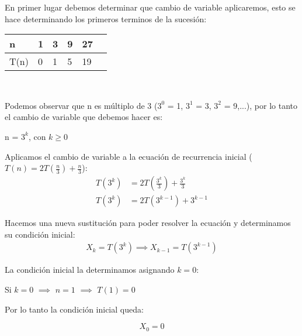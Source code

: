 \begin{solution}
  En primer lugar debemos determinar que cambio de variable aplicaremos, esto se hace determinando los primeros terminos de la sucesión:
  \begin{center}
    \begin{tabular}{@{}llllll@{}}
        \toprule
        n & 1 & 3 & 9 & 27 \\ \midrule
        T(n) & 0 & 1 & 5 & 19 \\ 
        \bottomrule
    \end{tabular}\\
  \end{center}
  
  Podemos observar que n es múltiplo de 3 ($3^0$ = 1, $3^1$ = 3, $3^2$ = 9,...), por lo tanto el cambio de variable que debemos hacer es:
  \begin{center}
      n = $3^k$, con $k \ge 0$
  \end{center}
  
  Aplicamos el cambio de variable a la ecuación de recurrencia inicial ($T(n) = 2T\left(\frac{n}{3}\right) + \frac{n}{3}$):
  \begin{align*}
      T(3^k) &= 2T\left(\frac{3^k}{3}\right) + \frac{3^k}{3}\\
      T(3^k) &= 2T(3^{k-1}) + 3^{k-1}
  \end{align*}

  Hacemos una nueva sustitución para poder resolver la ecuación y determinamos su condición inicial:
  \begin{align*}
      X_k = T(3^k) \implies X_{k-1} = T(3^{k-1})
  \end{align*}
  \begin{center}
      La condición inicial la determinamos asignando $k = 0$:
      
      Si $k = 0$ $\implies$ $n = 1$ $\implies$ $T(1) = 0$
      
      Por lo tanto la condición inicial queda:
      
      $$X_0 = 0$$
  \end{center}
  
\end{solution}
